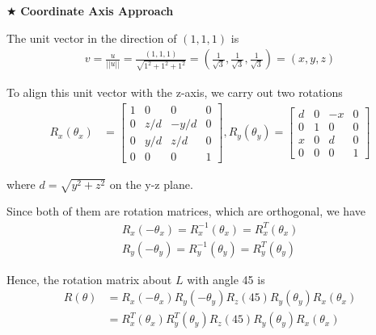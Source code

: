 \documentclass[11pt]{article}  %
\begin{document}
    \solution
    
    \noindent $\bigstar$ \textbf{ Coordinate Axis Approach}\vspace{2mm}
    
    The unit vector in the direction of $(1,1,1)$ is
    \begin{align*}
        v=\frac{u}{||u||}=\frac{(1,1,1)}{\sqrt{1^2+1^2+1^2}}=(\frac{1}{\sqrt{3}},\frac{1}{\sqrt{3}},\frac{1}{\sqrt{3}})=(x,y,z)
    \end{align*}
    
    To align this unit vector with the z-axis, we carry out two rotations
    \begin{align*}
        R_x(\theta _x) &= \begin{bmatrix}
            1 &   0   &   0   & 0\\
            0 &  z/d  & -y/d  & 0\\
            0 &  y/d  &  z/d  & 0\\
            0 &   0   &   0   & 1
        \end{bmatrix},
        R_y(\theta _y) = \begin{bmatrix}
            d & 0 & -x & 0\\
            0 & 1 &  0 & 0\\
            x & 0 &  d & 0\\
            0 & 0 &  0 & 1
        \end{bmatrix}
    \end{align*}
    
    where $d=\sqrt{y^{2} + z^{2}}$ on the y-z plane.
    
    Since both of them are rotation matrices, which are orthogonal, we have
    \begin{align*}
        R_x(-\theta _x)=R_x^{-1}(\theta _x)=R_x^T(\theta _x)\\
        R_y(-\theta _y)=R_y^{-1}(\theta _y)=R_y^T(\theta _y)
    \end{align*}
    
    Hence, the rotation matrix about $L$ with angle 45\textdegree\hspace{0mm} is
    \begin{align*}
        R(\theta) &= R_x(-\theta _x)R_y(-\theta _y)R_z(45)R_y(\theta _y)R_x(\theta _x)\\
        &= R_x^T(\theta _x)R_y^T(\theta _y)R_z(45)R_y(\theta _y)R_x(\theta _x)
    \end{align*}
    
\end{document}
